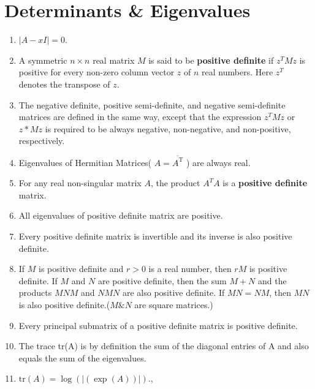 \documentclass[a4paper,oneside]{book}
\begin{document}
\section{Determinants \& Eigenvalues}
\begin{enumerate}
\item $\left|A - xI\right| = 0$.
\item A symmetric $n \times n$ real matrix $M$ is said to be \textbf{positive definite} if $z^TMz$ is positive for every non-zero column vector $z$ of $n$ real numbers. Here $z^T$ denotes the transpose of $z$.
\item The negative definite, positive semi-definite, and negative semi-definite matrices are defined in the same way, except that the expression $z^TMz$ or $z*Mz$ is required to be always negative, non-negative, and non-positive, respectively.
\item Eigenvalues of Hermitian Matrices( $A = \overline {A^\text{T}}$ ) are always real.
\item For any real non-singular matrix $A$, the product  $A^T A$  is a \textbf{positive definite} matrix. 
\item All eigenvalues of positive definite matrix are positive.
\item Every positive definite matrix is invertible and its inverse is also positive definite.
\item If $M$ is positive definite and $r > 0$ is a real number, then $rM$ is positive definite. If $M$ and $N$ are positive definite, then the sum $M + N$ and the products $MNM$ and $NMN$ are also positive definite. If $MN = NM$, then $MN$ is also positive definite.($M \& N$ are square matrices.)
\item Every principal submatrix of a positive definite matrix is positive definite.
\item The trace tr(A) is by definition the sum of the diagonal entries of A and also equals the sum of the eigenvalues.
\item $\mathrm{tr}(A) = \log(\left|(\exp(A))\right|)$.,
\end{enumerate}
\end{document}
